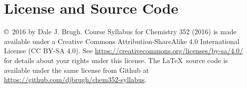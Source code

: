 \documentclass[letterpaper,oneside,onecolumn,11pt,article]{memoir}
\begin{document}
\section{License and Source Code}
\copyright\ 2016 by Dale J. Brugh. Course Syllabus for Chemistry 352 (2016) is made available under a Creative Commons Attribution-ShareAlike 4.0 International License (CC BY-SA 4.0). See \href{https://creativecommons.org/licenses/by-sa/4.0/}{https://creativecommons.org/licenses/by-sa/4.0/} for details about your rights under this license. The \LaTeX\ source code is available under the same license from Github at \href{https://github.com/djbrugh/chem352-syllabus}{https://github.com/djbrugh/chem352-syllabus}. 
\end{document}
